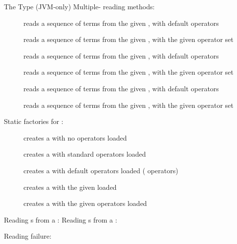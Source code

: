 \documentclass[handout]{beamer}
\begin{document}
\begin{frame}[allowframebreaks]{The  Type (JVM-only)}
    Multiple- reading methods:
    \begin{description}
        \item [] reads a sequence of terms from the given , with default operators
        \item [] reads a sequence of terms from the given , with the given operator set
        \item [] reads a sequence of terms from the given , with default operators
        \item [] reads a sequence of terms from the given , with the given operator set
        \item [] reads a sequence of terms from the given , with default operators
        \item [] reads a sequence of terms from the given , with the given operator set
    \end{description}

    \framebreak

    Static factories for :
    \begin{description}
        \item [] creates a  with no operators loaded
        \item [] creates a  with standard operators loaded
        \item [] creates a  with default operators loaded ( operators)
        \item [] creates a  with the given  loaded
        \item [] creates a  with the given operators loaded 
    \end{description}

    \framebreak

    Reading s from a :
    Reading s from a :

    \framebreak

    Reading failure:
\end{frame}
\end{document}
